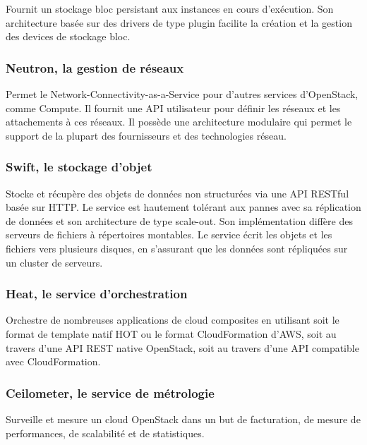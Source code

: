 \documentclass[]{article}
\begin{document}
Fournit un stockage bloc persistant aux instances en cours d'exécution.
Son architecture basée sur des drivers de type plugin facilite la
création et la gestion des devices de stockage bloc.

\subsubsection{Neutron, la gestion de
réseaux}\label{neutron-la-gestion-de-ruxe9seaux}

Permet le Network-Connectivity-as-a-Service pour d'autres services
d'OpenStack, comme Compute. Il fournit une API utilisateur pour définir
les réseaux et les attachements à ces réseaux. Il possède une
architecture modulaire qui permet le support de la plupart des
fournisseurs et des technologies réseau.

\subsubsection{Swift, le stockage
d'objet}\label{swift-le-stockage-dobjet}

Stocke et récupère des objets de données non structurées via une API
RESTful basée sur HTTP. Le service est hautement tolérant aux pannes
avec sa réplication de données et son architecture de type scale-out.
Son implémentation diffère des serveurs de fichiers à répertoires
montables. Le service écrit les objets et les fichiers vers plusieurs
disques, en s'assurant que les données sont répliquées sur un cluster de
serveurs.

\subsubsection{Heat, le service
d'orchestration}\label{heat-le-service-dorchestration}

Orchestre de nombreuses applications de cloud composites en utilisant
soit le format de template natif HOT ou le format CloudFormation d'AWS,
soit au travers d'une API REST native OpenStack, soit au travers d'une
API compatible avec CloudFormation.

\subsubsection{Ceilometer, le service de
métrologie}\label{ceilometer-le-service-de-muxe9trologie}

Surveille et mesure un cloud OpenStack dans un but de facturation, de
mesure de performances, de scalabilité et de statistiques.
\end{document}
